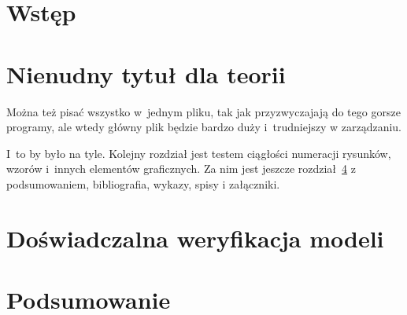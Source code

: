 \chapter{Wstęp}


\chapter{Nienudny tytuł dla teorii}
Można też pisać wszystko w~jednym pliku, tak jak przyzwyczajają do tego gorsze programy, ale wtedy główny plik będzie bardzo duży i~trudniejszy w zarządzaniu.

I~to by było na tyle. Kolejny rozdział jest testem ciągłości numeracji rysunków, wzorów i~innych elementów graficznych. Za nim jest jeszcze rozdział~\ref{ch:podsumowanie} z podsumowaniem, bibliografia, wykazy, spisy i załączniki.

%
%

\chapter{Doświadczalna weryfikacja modeli}


\chapter{Podsumowanie}
\label{ch:podsumowanie}

